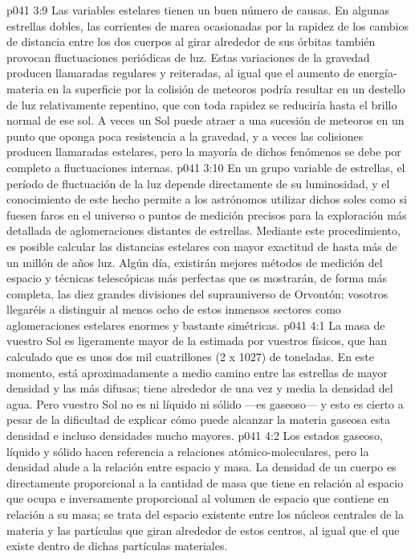 \vs p041 3:9 Las variables estelares tienen un buen número de causas. En algunas estrellas dobles, las corrientes de marea ocasionadas por la rapidez de los cambios de distancia entre los dos cuerpos al girar alrededor de sus órbitas también provocan fluctuaciones periódicas de luz. Estas variaciones de la gravedad producen llamaradas regulares y reiteradas, al igual que el aumento de energía\hyp{}materia en la superficie por la colisión de meteoros podría resultar en un destello de luz relativamente repentino, que con toda rapidez se reduciría hasta el brillo normal de ese sol. A veces un Sol puede atraer a una sucesión de meteoros en un punto que oponga poca resistencia a la gravedad, y a veces las colisiones producen llamaradas estelares, pero la mayoría de dichos fenómenos se debe por completo a fluctuaciones internas.
\vs p041 3:10 En un grupo variable de estrellas, el período de fluctuación de la luz depende directamente de su luminosidad, y el conocimiento de este hecho permite a los astrónomos utilizar dichos soles como si fuesen faros en el universo o puntos de medición precisos para la exploración más detallada de aglomeraciones distantes de estrellas. Mediante este procedimiento, es posible calcular las distancias estelares con mayor exactitud de hasta más de un millón de años luz. Algún día, existirán mejores métodos de medición del espacio y técnicas telescópicas más perfectas que os mostrarán, de forma más completa, las diez grandes divisiones del suprauniverso de Orvontón; vosotros llegaréis a distinguir al menos ocho de estos inmensos sectores como aglomeraciones estelares enormes y bastante simétricas.
\vs p041 4:1 La masa de vuestro Sol es ligeramente mayor de la estimada por vuestros físicos, que han calculado que es unos dos mil cuatrillones (2 x 1027) de toneladas. En este momento, está aproximadamente a medio camino entre las estrellas de mayor densidad y las más difusas; tiene alrededor de una vez y media la densidad del agua. Pero vuestro Sol no es ni líquido ni sólido ---es gaseoso--- y esto es cierto a pesar de la dificultad de explicar cómo puede alcanzar la materia gaseosa esta densidad e incluso densidades mucho mayores.
\vs p041 4:2 \pc Los estados gaseoso, líquido y sólido hacen referencia a relaciones atómico\hyp{}moleculares, pero la densidad alude a la relación entre espacio y masa. La densidad de un cuerpo es directamente proporcional a la cantidad de masa que tiene en relación al espacio que ocupa e inversamente proporcional al volumen de espacio que contiene en relación a su masa; se trata del espacio existente entre los núcleos centrales de la materia y las partículas que giran alrededor de estos centros, al igual que el que existe dentro de dichas partículas materiales.
